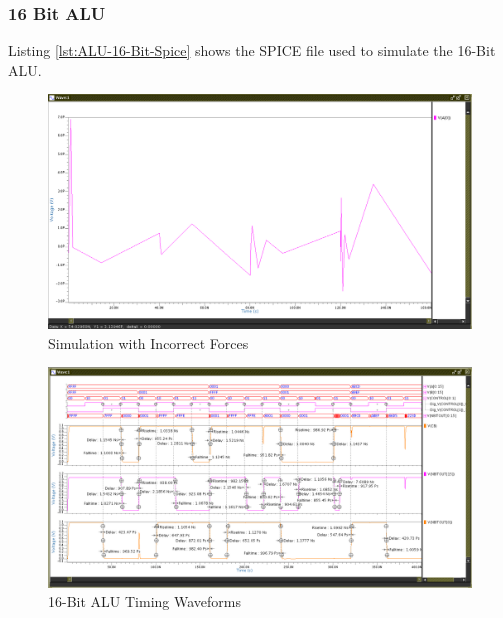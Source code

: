 \documentclass[11pt]{article}
\begin{document}
		\subsubsection{16 Bit ALU}
		
		
			Listing \ref{lst:ALU-16-Bit-Spice} shows the SPICE file used to simulate the 16-Bit ALU.  
		
		
			\begin{figure}[H]
				\centering
				\includegraphics[width=0.7\linewidth]{"Pictures/Terrible Simulation"}
				\caption{Simulation with Incorrect Forces}
				\label{fig:terrible-simulation}
			\end{figure}
			
		
			\begin{figure}[H]
				\centering
				\includegraphics[width=1\linewidth]{"Pictures/ALU 16-Bit Full Timing"}
				\caption{16-Bit ALU Timing Waveforms}
				\label{fig:alu-16-bit-full-timing}
			\end{figure}
			
\end{document}
